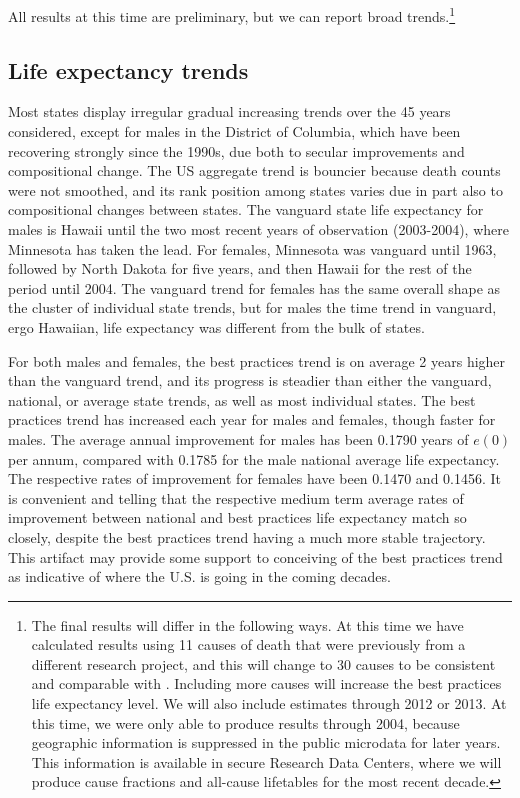 \documentclass[11pt,oneside,a4paper]{article} %
\begin{document}
All results at this time are preliminary, but we can report broad trends.\footnote{The final results will differ in the following ways. At this time we have
calculated results using 11 causes of death that were previously from a
different research project, and this will change to 30 causes to be consistent and comparable with \citet{vallin2008minimum}. Including
more causes will increase the best practices life expectancy level. We will also
include estimates through 2012 or 2013. At this time, we were only able to
produce results through 2004, because geographic information is suppressed in
the public microdata for later years. This information is available in secure
Research Data Centers, where we will produce cause fractions and all-cause lifetables for
the most recent decade.} 

\subsection*{Life expectancy trends}
Most states display irregular gradual increasing trends
over the 45 years considered, except for males in the District of Columbia,
which have been recovering strongly since the 1990s, due both to secular
improvements and compositional change. The US aggregate trend is bouncier
because death counts were not smoothed, and its rank position among states
varies due in part also to compositional changes between states. The vanguard
state life expectancy for males is Hawaii until the two most recent years of
observation (2003-2004), where Minnesota has taken the lead. For females,
Minnesota was vanguard until 1963, followed by North Dakota for five years, and
then Hawaii for the rest of the period until 2004. The vanguard trend for
females has the same overall shape as the cluster of individual state trends, but for males the time trend in vanguard, ergo Hawaiian, life expectancy was
different from the bulk of states. 

For both males and females, the best
practices trend is on average 2 years higher than the vanguard trend, and its
progress is steadier than either the vanguard, national, or average state
trends, as well as most individual states. The best practices trend has increased each year for
males and females, though faster for males. The average annual improvement for
males has been 0.1790 years of $e(0)$ per annum, compared with 0.1785 for the
male national average life expectancy. The respective rates of improvement for
females have been 0.1470 and 0.1456. It is convenient and telling that the
respective medium term average rates of improvement between national and
best practices life expectancy match so closely, despite the best practices
trend having a much more stable trajectory. This artifact may provide some
support to conceiving of the best practices trend as indicative of where the
U.S. is going in the coming decades.
\end{document}
